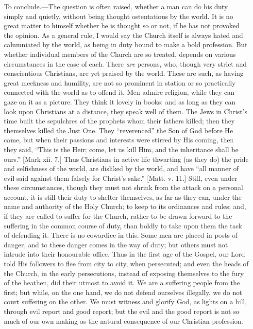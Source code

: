 To conclude.—The question is often raised,
whether a man can do his duty simply and quietly, without
being thought ostentatious by the world. It is no great
matter to himself whether he is thought so or not, if he
has not provoked the opinion. As a general rule, I would
say the Church itself is always hated and calumniated by
the world, as being in duty bound to make a bold
profession. But whether individual members of the Church
are so treated, depends on various circumstances in the
case of each. There \emph{are} persons, who, though very
strict and conscientious Christians, are yet praised by
the world. These are such, as having great meekness and
humility, are not so prominent in station or so
practically connected with the world as to offend it. Men
admire religion, while they can gaze on it as a picture.
They think it lovely in books: and as long as they can
look upon Christians at a distance, they speak well of
them. The Jews in Christ's time built the sepulchres of
the prophets whom their fathers killed; then they
themselves killed the Just One. They
``reverenced'' the Son of God before He came, but
when their passions and interests were stirred by His
coming, then they said, ``This is the Heir; come, let
us kill Him, and the inheritance shall be ours.''
[Mark xii. 7.] Thus Christians in active life thwarting
(as they do) the pride and selfishness of the world, are
disliked by the world, and have ``all manner of evil
said against them falsely for Christ's sake.'' [Matt.
v. 11.] Still, even under these circumstances, though
they must not shrink from the attack on a personal
account, it is still their duty to shelter themselves, as
far as they can, under the name and authority of the Holy
Church; to keep to its ordinances and rules; and, if they
are called to suffer for the Church, rather to be drawn
forward to the suffering in the common course of duty,
than boldly to take upon them the task of defending it.
There is no cowardice in this. Some men are placed in
posts of danger, and to these danger comes in the way of
duty; but others must not intrude into their honourable
office. Thus in the first age of the Gospel, our Lord
told His followers to flee from city to city, when
persecuted; and even the heads of the Church, in the
early persecutions, instead of exposing themselves to the
fury of the heathen, did their utmost to avoid it. We are
a suffering people from the first; but while, on the one
hand, we do not defend ourselves illegally, we do not
court suffering on the other. We must witness and glorify
God, as lights on a hill, through evil report and good
report; but the evil and the good report is not so much
of our own making as the natural consequence of our
Christian profession.

